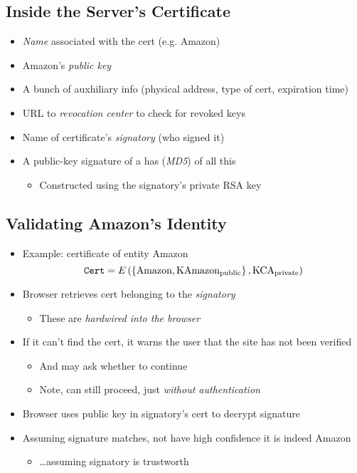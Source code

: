\subsection{Inside the Server's Certificate}
\begin{itemize}[nosep]
    \item \emph{Name} associated with the cert (e.g. Amazon)
    \item Amazon's \emph{public key}
    \item A bunch of auxhiliary info (physical address, type of cert, expiration time)
    \item URL to \emph{revocation center} to check for revoked keys
    \item Name of certificate's \emph{signatory} (who signed it)
    \item A public-key signature of a has (\emph{MD5}) of all this
          \begin{itemize}[nosep]
              \item Constructed using the signatory's private RSA key
          \end{itemize}
\end{itemize}

\subsection{Validating Amazon's Identity}
\begin{itemize}[nosep]
    \item Example: certificate of entity Amazon
          \[\texttt{Cert} = E\left(\left\{\text{Amazon}, \text{KAmazon}_{\text{public}}\right\}, \text{KCA}_{\text{private}}\right)\]
    \item Browser retrieves cert belonging to the \emph{signatory}
          \begin{itemize}[nosep]
              \item These are \emph{hardwired into the browser}
          \end{itemize}
    \item If it can't find the cert, it warns the user that the site has not been verified
          \begin{itemize}[nosep]
              \item And may ask whether to continue
              \item Note, can still proceed, just \emph{without authentication}
          \end{itemize}
    \item Browser uses public key in signatory's cert to decrypt signature
    \item Assuming signature matches, not have high confidence it is indeed Amazon
          \begin{itemize}[nosep]
              \item \dots assuming signatory is trustworth
          \end{itemize}
\end{itemize}

